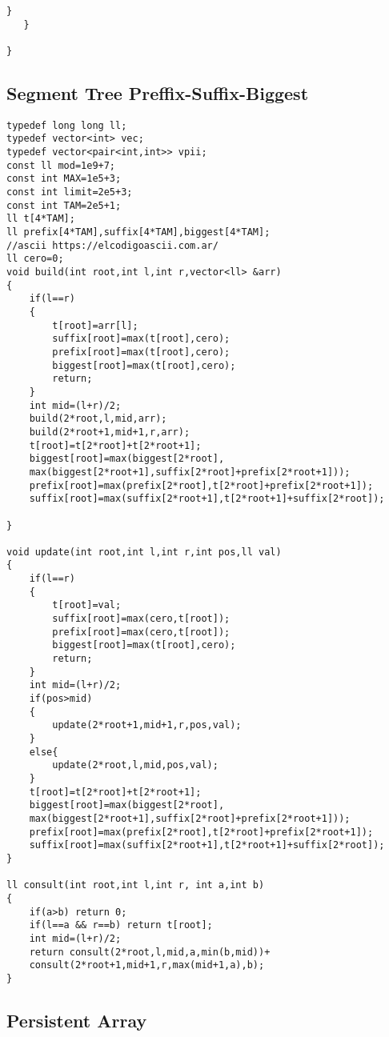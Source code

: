 \documentclass[10pt]{article}
\begin{document}
\begin{multicols*}{2}
\begin{lstlisting}[style=compactcpp]
        }
   }

}

\end{lstlisting}

\subsection{Segment Tree Preffix-Suffix-Biggest}

\begin{lstlisting}[style=compactcpp]
typedef long long ll;
typedef vector<int> vec;
typedef vector<pair<int,int>> vpii;
const ll mod=1e9+7;
const int MAX=1e5+3;
const int limit=2e5+3;
const int TAM=2e5+1;
ll t[4*TAM];
ll prefix[4*TAM],suffix[4*TAM],biggest[4*TAM];
//ascii https://elcodigoascii.com.ar/
ll cero=0;
void build(int root,int l,int r,vector<ll> &arr)
{
    if(l==r)
    {
        t[root]=arr[l];
        suffix[root]=max(t[root],cero);
        prefix[root]=max(t[root],cero);
        biggest[root]=max(t[root],cero);
        return;
    }
    int mid=(l+r)/2;
    build(2*root,l,mid,arr);
    build(2*root+1,mid+1,r,arr);
    t[root]=t[2*root]+t[2*root+1];
    biggest[root]=max(biggest[2*root],
    max(biggest[2*root+1],suffix[2*root]+prefix[2*root+1]));
    prefix[root]=max(prefix[2*root],t[2*root]+prefix[2*root+1]);
    suffix[root]=max(suffix[2*root+1],t[2*root+1]+suffix[2*root]);
    
}

void update(int root,int l,int r,int pos,ll val)
{
    if(l==r)
    {
        t[root]=val;
        suffix[root]=max(cero,t[root]);
        prefix[root]=max(cero,t[root]);
        biggest[root]=max(t[root],cero);
        return;
    }
    int mid=(l+r)/2;
    if(pos>mid)
    {
        update(2*root+1,mid+1,r,pos,val);
    }
    else{
        update(2*root,l,mid,pos,val);
    }
    t[root]=t[2*root]+t[2*root+1];
    biggest[root]=max(biggest[2*root],
    max(biggest[2*root+1],suffix[2*root]+prefix[2*root+1]));
    prefix[root]=max(prefix[2*root],t[2*root]+prefix[2*root+1]);
    suffix[root]=max(suffix[2*root+1],t[2*root+1]+suffix[2*root]);
}

ll consult(int root,int l,int r, int a,int b)
{
    if(a>b) return 0;
    if(l==a && r==b) return t[root];
    int mid=(l+r)/2;
    return consult(2*root,l,mid,a,min(b,mid))+
    consult(2*root+1,mid+1,r,max(mid+1,a),b);
}
\end{lstlisting}

\subsection{Persistent Array}


\end{multicols*}
\end{document}
